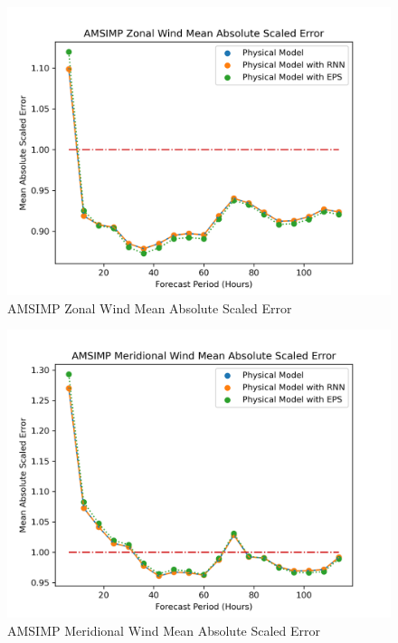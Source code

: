 \begin{figure}[H]
    \centering
    \includegraphics[width=.8\linewidth]{Graphs/accuracy/mase/zonal_wind.png}
    \caption{AMSIMP Zonal Wind Mean Absolute Scaled Error}
\end{figure}

\begin{figure}[H]
    \centering
    \includegraphics[width=.8\linewidth]{Graphs/accuracy/mase/meridional_wind.png}
    \caption{AMSIMP Meridional Wind Mean Absolute Scaled Error}
\end{figure}

